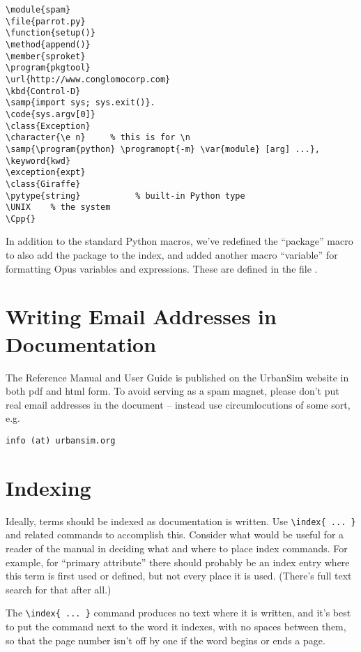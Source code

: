 \begin{verbatim}
\module{spam}
\file{parrot.py}
\function{setup()}
\method{append()}
\member{sproket}
\program{pkgtool}
\url{http://www.conglomocorp.com}
\kbd{Control-D}
\samp{import sys; sys.exit()}.
\code{sys.argv[0]}
\class{Exception}
\character{\e n}     % this is for \n
\samp{\program{python} \programopt{-m} \var{module} [arg] ...},
\keyword{kwd}
\exception{expt}
\class{Giraffe}
\pytype{string}           % built-in Python type
\UNIX    % the system
\Cpp{}
\end{verbatim}

In addition to the standard Python macros, we've redefined the ``package'' macro 
to also add the package to the index, and added another macro ``variable'' for 
formatting Opus variables and expressions.  These are defined in the file 
.


\section{Writing Email Addresses in Documentation}

The Reference Manual and User Guide is published on the UrbanSim website in
both pdf and html form.  To avoid serving as a spam magnet, please don't put
real email addresses in the document -- instead use circumlocutions of
some sort, e.g.\

\begin{verbatim}
info (at) urbansim.org
\end{verbatim}

\section{Indexing}

Ideally, terms should be indexed as documentation is written.  Use
\verb|\index{ ... }| and related commands to accomplish this.  Consider
what would be useful for a reader of the manual in deciding what and where
to place index commands.  For example, for ``primary attribute'' there
should probably be an index entry where this term is first used or defined,
but not every place it is used.  (There's full text search for that after all.)

The \verb|\index{ ... }| command produces no text where it is written, and
it's best to put the command next to the word it indexes, with no spaces
between them, so that the page number isn't off by one if the word begins
or ends a page.

